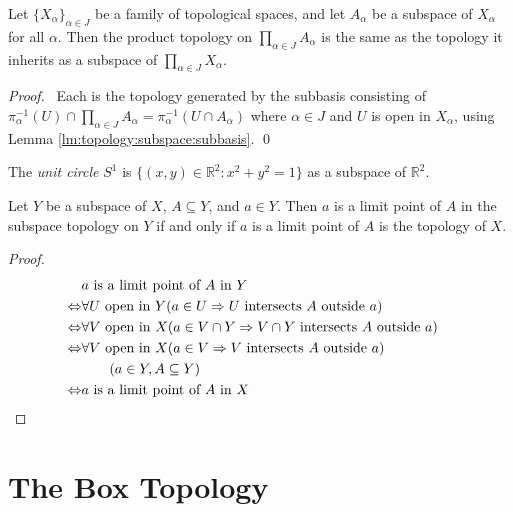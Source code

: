 \begin{thm}
  Let $\{X_\alpha\}_{\alpha \in J}$ be a family of topological spaces, and
  let $A_\alpha$ be a subspace of $X_\alpha$ for all $\alpha$. Then the
  product
  topology on $\prod_{\alpha \in J} A_\alpha$ is the same as the topology it
  inherits as a subspace of $\prod_{\alpha \in J} X_\alpha$.
\end{thm}

\begin{proof}
  \pf\ Each is the topology generated by the subbasis consisting of
  $\pi_\alpha^{-1}(U) \cap \prod_{\alpha \in J} A_\alpha = \pi_\alpha^{-1}(U
  \cap A_\alpha)$ where $\alpha \in J$ and $U$ is open in $X_\alpha$, using
  Lemma
  \ref{lm:topology:subspace:subbasis}. \qed
\end{proof}

\begin{df}
  The \emph{unit circle} $S^1$ is $\{ (x,y) \in \mathbb{R}^2 : x^2 + y^2 = 1
  \}$ as a subspace of $\mathbb{R}^2$.
\end{df}

\begin{prop}
  \label{prop:topology:subspace:limit_point}
  Let $Y$ be a subspace of $X$, $A \subseteq Y$, and $a \in Y$. Then $a$ is a
  limit point of $A$ in the subspace topology on $Y$ if and only if $a$ is a
  limit point of $A$ is the topology of $X$.
\end{prop}

\begin{proof}
  \pf
  \begin{align*}
    & a \text{ is a limit point of } A \text{ in } Y \\
    \Leftrightarrow & \forall U \text{ open in } Y( a \in U \Rightarrow U
    \text{ intersects } A \text{ outside } a) \\
    \Leftrightarrow & \forall V \text{ open in } X( a \in V \cap Y
    \Rightarrow
    V \cap Y \text{ intersects } A \text{ outside } a) \\
    \Leftrightarrow & \forall V \text{ open in } X( a \in V \Rightarrow V
    \text{ intersects } A \text{ outside } a) \\
    & \qquad (a \in Y, A \subseteq Y) \\
    \Leftrightarrow & a \text{ is a limit point of } A \text{ in } X & \qed
  \end{align*}
\end{proof}

\section{The Box Topology}

